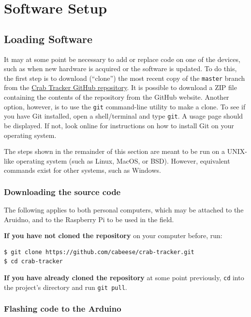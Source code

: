 \documentclass[12pt]{article}
\begin{document}
\section{Software Setup}

\subsection{Loading Software}

It may at some point be necessary to add or replace code on one of the devices,
such as when new hardware is acquired or the software is updated.
To do this, the first step is to download (``clone'') the most recent copy
of the \texttt{master} branch from the
\href{https://github.com/cabeese/crab-tracker/}
{Crab Tracker GitHub repository}.
It is possible to download a ZIP file containing the contents of the repository
from the GitHub website.
Another option, however, is to use the \texttt{git} command-line utility to
make a clone.
To see if you have Git installed, open a shell/terminal and type \texttt{git}.
A usage page should be displayed.
If not, look online for instructions on how to install Git on your operating
system.

The steps shown in the remainder of this section are meant to be run on a
UNIX-like operating system (such as Linux, MacOS, or BSD).
However, equivalent commands exist for other systems, such as Windows.

\subsubsection{Downloading the source code}\label{sec:git}

The following applies to both personal computers, which may be attached to
the Aruidno, and to the Raspberry Pi to be used in the field.

\textbf{If you have not cloned the repository} on your computer before, run:

\begin{lstlisting}[language=bash]
$ git clone https://github.com/cabeese/crab-tracker.git
$ cd crab-tracker
\end{lstlisting}

\textbf{If you have already cloned the repository} at some point previously,
\texttt{cd} into the project's directory and run \texttt{git pull}.

\subsubsection{Flashing code to the Arduino}
\end{document}
